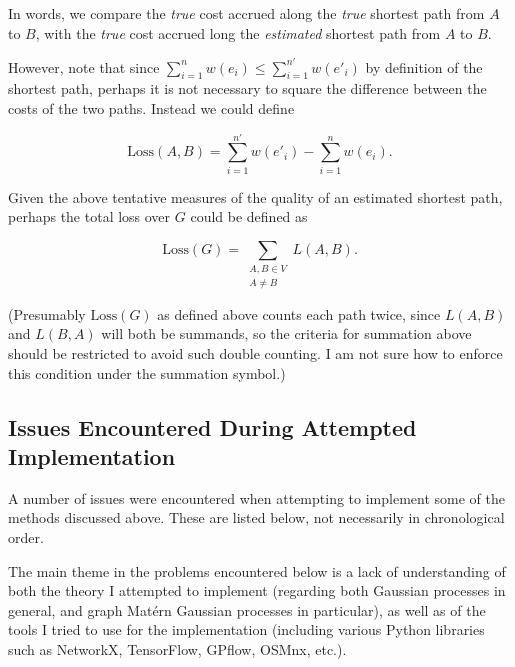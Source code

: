 In words, we compare the \textit{true} cost accrued along the \textit{true} shortest path from $A$ to $B$, with the \textit{true} cost accrued long the \textit{estimated} shortest path from $A$ to $B$.

However, note that since $\sum_{i = 1}^n w(e_i) \leq \sum_{i = 1}^{n'} w(e'_i)$ by definition of the shortest path, perhaps it is not necessary to square the difference between the costs of the two paths. Instead we could define

\[
    \text{Loss}(A, B) = \sum_{i = 1}^{n'} w(e'_i) - \sum_{i = 1}^n w(e_i).
\]

Given the above tentative measures of the quality of an estimated shortest path, perhaps the total loss over $G$ could be defined as

\[
    \text{Loss}(G) = \sum_{\substack{A, B \in V \\ A \neq B}} L(A, B).
\]

(Presumably $\text{Loss}(G)$ as defined above counts each path twice, since $L(A, B)$ and $L(B, A)$ will both be summands, so the criteria for summation above should be restricted to avoid such double counting. I am not sure how to enforce this condition under the summation symbol.)


\subsection{Issues Encountered During Attempted Implementation}

A number of issues were encountered when attempting to implement some of the methods discussed above. These are listed below, not necessarily in chronological order.

The main theme in the problems encountered below is a lack of understanding of both the theory I attempted to implement (regarding both Gaussian processes in general, and graph Mat\'{e}rn Gaussian processes in particular), as well as of the tools I tried to use for the implementation (including various Python libraries such as NetworkX, TensorFlow, GPflow, OSMnx, etc.).

